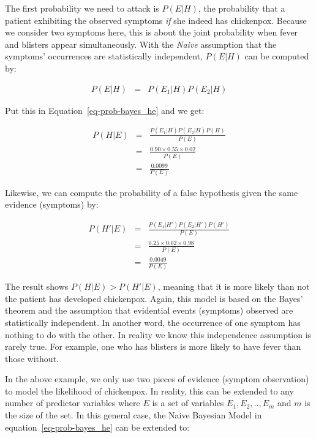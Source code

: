 \documentclass[
  letterpaper,
]{scrbook}
\begin{document}
The first probability we need to attack is \(P(E|H)\), the probability
that a patient exhibiting the observed symptoms \emph{if} she indeed has
chickenpox. Because we consider two symptoms here, this is about the
joint probability when fever and blisters appear simultaneously. With
the \emph{Naive} assumption that the symptoms' occurrences are
statistically independent, \(P(E|H)\) can be computed by:

\[\begin{aligned}
P(E|H)
& = & P(E_1|H) P(E_2|H)
\end{aligned}\]

Put this in
Equation~\hyperref[eq-prob-bayes_he]{{[}eq-prob-bayes\_he{]}} and we
get:

\[\begin{aligned}
P(H|E)
& = & \frac{P(E_1|H) P(E_2|H) P(H)}{P(E)} \\
& = & \frac{0.90 \times 0.55 \times 0.02}{P(E)} \\
& = & \frac{0.0099}{P(E)}
\end{aligned}\]

Likewise, we can compute the probability of a false hypothesis given the
same evidence (symptoms) by:

\[\begin{aligned}
P(H'|E)
& = & \frac{P(E_1|H') P(E_2|H') P(H')}{P(E)} \\
& = & \frac{0.25 \times 0.02 \times 0.98}{P(E)} \\
& = & \frac{0.0049}{P(E)}
\end{aligned}\]

The result shows \(P(H|E) > P(H'|E)\), meaning that it is more likely
than not the patient has developed chickenpox. Again, this model is
based on the Bayes' theorem and the assumption that evidential events
(symptoms) observed are statistically independent. In another word, the
occurrence of one symptom has nothing to do with the other. In reality
we know this independence assumption is rarely true. For example, one
who has blisters is more likely to have fever than those without.

In the above example, we only use two pieces of evidence (symptom
observation) to model the likelihood of chickenpox. In reality, this can
be extended to any number of predictor variables where \(E\) is a set of
variables \(E_1, E_2, .., E_m\) and \(m\) is the size of the set. In
this general case, the Naive Bayesian Model in
equation~\hyperref[eq-prob-bayes_he]{{[}eq-prob-bayes\_he{]}} can be
extended to:
\end{document}
